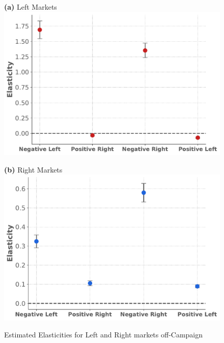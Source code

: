 \documentclass[12pt]{article}
\begin{document}
\begin{figure}[!htbp]
	\centering
	\caption{Estimated Elasticities for Left and Right markets off-Campaign}
	\label{fig:elasticities_pre}
	\vspace{0.5em} %
	
	\begin{minipage}{0.45\textwidth}
		\centering
		\textbf{(a)} Left Markets\\
		\includegraphics[width=\linewidth]{figures/elasticities_left_pre}
	\end{minipage}
	\hfill
	\begin{minipage}{0.45\textwidth}
		\centering
		\vspace{1.5em}
		\textbf{(b)} Right Markets \\
		\includegraphics[width=\linewidth]{figures/elasticities_right_pre}
		\label{fig:2figsA}
	\end{minipage}
	

\end{figure}
\end{document}
